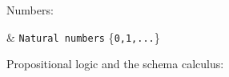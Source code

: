 \documentclass[a4paper,9pt]{article}
\begin{document}
Numbers:
\begin{symtab}
        \nat & \verb/Natural numbers/ \{\verb/0,1,.../\} \\
\end{symtab}
Propositional logic and the schema calculus:
\end{document}
